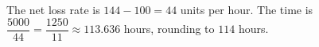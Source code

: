 The net loss rate is $144-100=44$ units per hour. The time is $\dfrac{5000}{44}=\dfrac{1250}{11}\approx113.636$ hours, rounding to $\boxed{114}$ hours.
